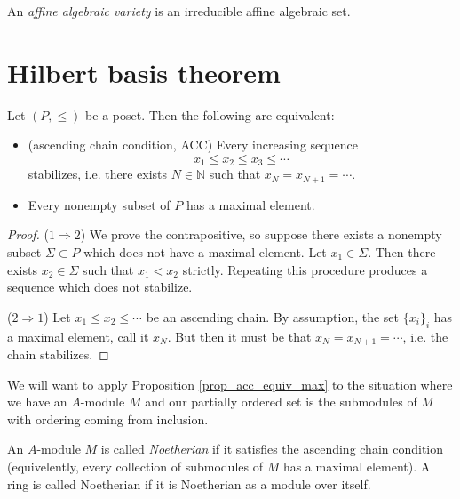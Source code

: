 \documentclass[12pt]{article}
\begin{document}
\begin{definition}
	An \emph{affine algebraic variety} is an irreducible affine algebraic set.
\end{definition}


\section{Hilbert basis theorem} %

\begin{proposition}
\label{prop_acc_equiv_max}
	Let $(P,\leq)$ be a poset. Then the following are equivalent:
	\begin{itemize}
		\item (ascending chain condition, ACC) Every increasing sequence
			\begin{equation*}
				x_1 \leq x_2 \leq x_3 \leq \cdots 
			\end{equation*}
			stabilizes, i.e. there exists $N\in\mathbb{N}$ such that $x_N=x_{N+1}=\cdots$.
		\item Every nonempty subset of $P$ has a maximal element.
	\end{itemize}
\end{proposition}
\begin{proof}
	($1\Rightarrow 2$) We prove the contrapositive, so suppose there exists a nonempty subset $\Sigma\subset P$ which does not have a maximal element. Let $x_1\in\Sigma$. Then there exists $x_2\in\Sigma$ such that $x_1<x_2$ strictly. Repeating this procedure produces a sequence which does not stabilize.

	($2\Rightarrow 1$) Let $x_1\leq x_2\leq \cdots$ be an ascending chain. By assumption, the set $\{x_i\}_i$ has a maximal element, call it $x_N$. But then it must be that $x_N=x_{N+1}=\cdots$, i.e. the chain stabilizes. 
\end{proof}

We will want to apply Proposition \ref{prop_acc_equiv_max} to the situation where we have an $A$-module $M$ and our partially ordered set is the submodules of $M$ with ordering coming from inclusion.

\begin{definition}
	An $A$-module $M$ is called \emph{Noetherian} if it satisfies the ascending chain condition (equivelently, every collection of submodules of $M$ has a maximal element). A ring is called Noetherian if it is Noetherian as a module over itself.
\end{definition}
\end{document}
